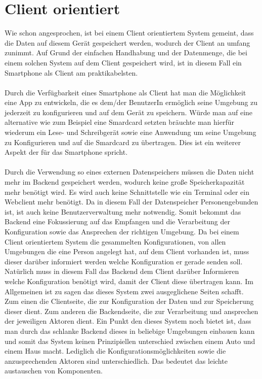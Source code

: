 \section{Client orientiert}

Wie schon angesprochen, ist bei einem Client orientiertem System gemeint, dass die Daten auf diesem Gerät gespeichert werden, wodurch der Client an umfang zunimmt. Auf Grund der einfachen Handhabung und der Datenmenge, die bei einem solchen System auf dem Client gespeichert wird, ist in diesem Fall ein Smartphone als Client am praktikabelsten.  
\\\\
Durch die Verfügbarkeit eines Smartphone als Client hat man die Möglichkeit eine App zu entwickeln, die es dem/der BenutzerIn ermöglich seine Umgebung zu jederzeit zu konfigurieren und auf dem Gerät zu speichern. Würde man auf eine alternative wie zum Beispiel eine Smardcard setzten bräuchte man hierfür wiederum ein Lese- und Schreibgerät sowie eine Anwendung um seine Umgebung zu Konfigurieren und auf die Smardcard zu übertragen. Dies ist ein weiterer Aspekt der für das Smartphone spricht.
\\\\
Durch die Verwendung so eines externen Datenspeichers müssen die Daten nicht mehr im Backend gespeichert werden, wodurch keine große Speicherkapazität mehr benötigt wird. Es wird auch keine Schnittstelle wie ein Terminal oder ein Webclient mehr benötigt. Da in diesem Fall der Datenspeicher Personengebunden ist, ist auch keine Benutzerverwaltung mehr notwendig. Somit bekommt das Backend eine Fokussierung auf das Empfangen und die Verarbeitung der Konfiguration sowie das Ansprechen der richtigen Umgebung.
Da bei einem Client orientiertem System die gesammelten Konfigurationen, von allen Umgebungen die eine Person angelegt hat, auf dem Client vorhanden ist, muss dieser darüber informiert werden welche Konfiguration er gerade senden soll. 
Natürlich muss in diesem Fall das Backend dem Client darüber Informieren welche Konfiguration benötigt wird, damit der Client diese übertragen kann. Im Allgemeinen ist zu sagen das dieses System zwei ausgeglichene Seiten schafft. Zum einen die Clientseite, die zur Konfiguration der Daten und zur Speicherung dieser dient. Zum anderen die Backendseite, die zur Verarbeitung und ansprechen der jeweiligen Aktoren dient. Ein Punkt den dieses System noch bietet ist, dass man durch das schlanke Backend dieses in beliebige Umgebungen einbauen kann und somit das System keinen Prinzipiellen unterschied zwischen einem Auto und einem Haus macht. Lediglich die Konfigurationsmöglichkeiten sowie die anzusprechenden Aktoren sind unterschiedlich. Das bedeutet das leichte austauschen von Komponenten.

